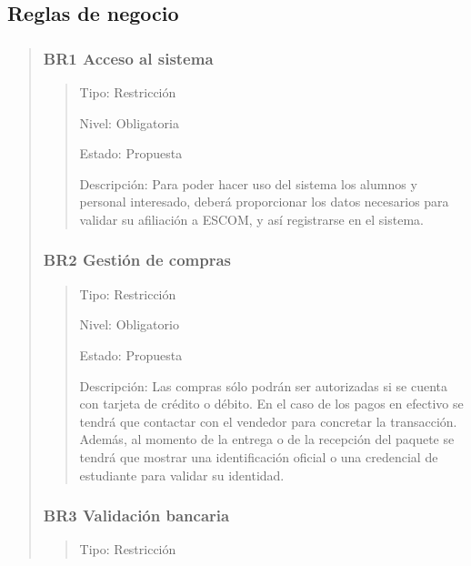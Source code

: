 \documentclass[14pt]{article}
\begin{document}
        \subsection{Reglas  de negocio}
            \begin{quote}
                \subsubsection{BR1 Acceso al sistema}\label{BR1 Acceso al sistema}
                    \begin{quote}
                        Tipo: Restricción
                        
                        Nivel: Obligatoria
                        
                        Estado: Propuesta
                        
                        Descripción: Para poder hacer uso del sistema los alumnos y personal interesado, deberá proporcionar los datos necesarios para validar su afiliación a ESCOM, y así registrarse en el sistema.
                    \end{quote}
                \subsubsection{BR2 Gestión de compras}\label{BR2 Gestión de compras}
                    \begin{quote}
                        Tipo: Restricción
    
                        Nivel: Obligatorio
    
                        Estado: Propuesta
    
                        Descripción: Las compras sólo podrán ser autorizadas si se cuenta con tarjeta de crédito o débito. En el caso de los pagos en efectivo se tendrá que contactar con el vendedor para concretar la transacción. Además, al momento de la entrega o de la recepción del paquete se tendrá que mostrar una identificación oficial o una credencial de estudiante para validar su identidad.
                    \end{quote}
                \subsubsection{BR3 Validación bancaria}\label{BR3 Validación bancaria}
                    \begin{quote}
                        Tipo: Restricción
    

\end{quote}
\end{quote}
\end{document}
